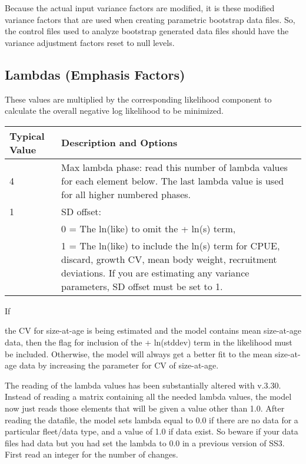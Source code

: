 Because the actual input variance factors are modified, it is these modified variance factors that are used when creating parametric bootstrap data files. So, the control files used to analyze bootstrap generated data files should have the variance adjustment factors reset to null levels.


\hypertarget{Lambdas}{}
\subsection{Lambdas (Emphasis Factors)}
These values are multiplied by the corresponding likelihood component to calculate the overall negative log likelihood to be minimized.


\begin{tabular}{p{3cm} p{13cm}}
	\hline
	Typical Value & Description and Options \Tstrut\Bstrut\\
	\hline
	4 \Tstrut & Max lambda phase: read this number of lambda values for each element below. The last lambda value is used for all higher numbered phases. \Bstrut\\
	1 & SD offset: \\
	  & 0 = The ln(like) to omit the + ln(s) term, \\
	  & 1 = The ln(like) to include the ln(s) term for CPUE, discard, growth CV, mean body weight, recruitment deviations. If you are estimating any variance parameters, SD offset must be set to 1. \Bstrut\\
	\hline
\end{tabular}

\pagebreak

\hypertarget{SaAlambda}{If} the CV for size-at-age is being estimated and the model contains mean size-at-age data, then the flag for inclusion of the + ln(stddev) term in the likelihood must be included. Otherwise, the model will always get a better fit to the mean size-at-age data by increasing the parameter for CV of size-at-age.

The reading of the lambda values has been substantially altered with v.3.30. Instead of reading a matrix containing all the needed lambda values, the model now just reads those elements that will be given a value other than 1.0. After reading the datafile, the model sets lambda equal to 0.0 if there are no data for a particular fleet/data type, and a value of 1.0 if data exist. So beware if your data files had data but you had set the lambda to 0.0 in a previous version of SS3. First read an integer for the number of changes.

